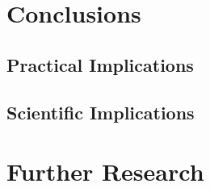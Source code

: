 \section{Conclusions}

\subsection{Practical Implications}

\subsection{Scientific Implications}

\section{Further Research}